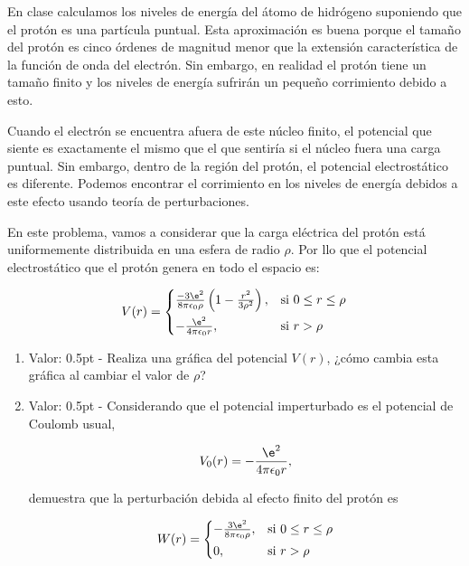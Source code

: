 \documentclass[./../main.tex]{subfiles}
\begin{document}
    \begin{exercise}
        En clase calculamos los niveles de energía del átomo de hidrógeno suponiendo que el protón es una partícula puntual. Esta aproximación es buena porque el tamaño del protón es cinco órdenes de magnitud menor que la extensión característica de la función de onda del electrón. Sin embargo, en realidad el protón tiene un tamaño finito y los niveles de energía sufrirán un pequeño corrimiento debido a esto.

        Cuando el electrón se encuentra afuera de este núcleo finito, el potencial que siente es exactamente el mismo que el que sentiría si el núcleo fuera una carga puntual. Sin embargo, dentro de la región del protón, el potencial electrostático es diferente. Podemos encontrar el corrimiento en los niveles de energía debidos a este efecto usando teoría de perturbaciones.

        En este problema, vamos a considerar que la carga eléctrica del protón está uniformemente distribuida en una esfera de radio \(\rho\). Por llo que el potencial electrostático que el protón genera en todo el espacio es:

        \begin{equation*}
            V(r) = 
            \begin{cases*}
                \tfrac{-3\e^{2}}{8\pi\epsilon_{0}\rho}\left(1 - \tfrac{r^{2}}{3\rho^{2}}\right), & si \(0 \leq r \leq \rho\)\\
                -\tfrac{\e^{2}}{4\pi\epsilon_{0}r}, & si \(r > \rho\)
            \end{cases*}
        \end{equation*}

        \begin{enumerate}
            \item Valor: 0.5pt - Realiza una gráfica del potencial \(V(r)\), ¿cómo cambia esta gráfica al cambiar el valor de \(\rho\)?
            \item Valor: 0.5pt - Considerando que el potencial imperturbado es el potencial de Coulomb usual,
            
            \begin{equation*}
                V_{0}(r) = -\dfrac{\e^{2}}{4\pi\epsilon_{0}r},
            \end{equation*}

            demuestra que la perturbación debida al efecto finito del protón es

            \begin{equation*}
                W(r) = 
                \begin{cases*}
                    -\tfrac{3\e^{2}}{8\pi\epsilon_{0}\rho}, & si \(0 \leq r \leq \rho\)\\
                    0, & si \(r > \rho\)
                \end{cases*}
            \end{equation*}


\end{enumerate}
\end{exercise}
\end{document}
